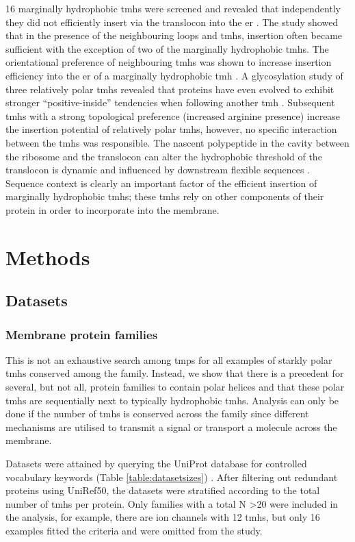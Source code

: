 16 marginally hydrophobic \gls{tmh}s were screened and revealed that independently they did not efficiently insert via the translocon into the \gls{er} \cite{Hedin2010}.
The study showed that in the presence of the neighbouring loops and \gls{tmh}s, insertion often became sufficient with the exception of two of the marginally hydrophobic \gls{tmh}s.
The orientational preference of neighbouring \gls{tmh}s was shown to increase insertion efficiency into the \gls{er} of a marginally hydrophobic \gls{tmh} \cite{Ojemalm2012}.
A glycosylation study of three relatively polar \gls{tmh}s revealed that proteins have even evolved to exhibit stronger ``positive\--inside'' tendencies when following another \gls{tmh} \cite{Virkki2014}.
Subsequent \gls{tmh}s with a strong topological preference (increased arginine presence) increase the insertion potential of relatively polar \gls{tmh}s, however, no specific interaction between the \gls{tmh}s was responsible.
The nascent polypeptide in the cavity between the ribosome and the translocon can
alter the hydrophobic threshold of the translocon is dynamic and influenced by downstream flexible sequences \cite{Junne2017}.
Sequence context is clearly an important factor of the efficient insertion of marginally hydrophobic \gls{tmh}s; these \gls{tmh}s rely on other components of their protein in order to incorporate into the membrane.

\section{Methods}
\subsection{Datasets}
\subsubsection{Membrane protein families}
This is not an exhaustive search among \gls{tmp}s for all examples of starkly polar \gls{tmh}s conserved among the family.
Instead, we show that there is a precedent for several, but not all, protein families to contain polar helices and that these polar \gls{tmh}s are sequentially next to typically hydrophobic \gls{tmh}s.
Analysis can only be done if the number of \gls{tmh}s is conserved across the family since different mechanisms are utilised to transmit a signal or transport a molecule across the membrane.

Datasets were attained by querying the UniProt database for controlled vocabulary keywords (Table \ref{table:datasetsizes}) \cite{TheUniProtConsortium2014}.
After filtering out redundant proteins using UniRef50, the datasets were stratified according to the total number of \gls{tmh}s per protein.
Only families with a total N \textgreater  20 were included in the analysis, for example, there are ion channels with 12 \gls{tmh}s, but only 16 examples fitted the criteria and were omitted from the study.



